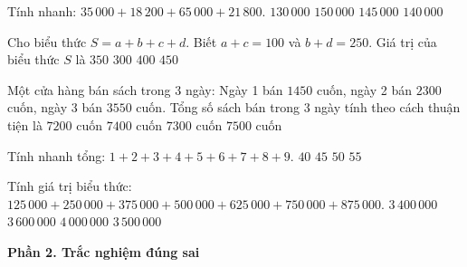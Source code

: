 \begin{ex} %
Tính nhanh: $35\,000 + 18\,200 + 65\,000 + 21\,800$.
\choice
{$130\,000$}
{$150\,000$}
{$145\,000$}
{\True $140\,000$}
\end{ex}

\begin{ex} %
Cho biểu thức $S = a + b + c + d$. Biết $a + c = 100$ và $b + d = 250$. Giá trị của biểu thức $S$ là
\choice
{\True $350$}
{$300$}
{$400$}
{$450$}
\end{ex}

\begin{ex} %
Một cửa hàng bán sách trong 3 ngày: Ngày 1 bán $1450$ cuốn, ngày 2 bán $2300$ cuốn, ngày 3 bán $3550$ cuốn. Tổng số sách bán trong 3 ngày tính theo cách thuận tiện là
\choice
{$7200$ cuốn}
{$7400$ cuốn}
{\True $7300$ cuốn}
{$7500$ cuốn}
\end{ex}

\begin{ex} %
Tính nhanh tổng: $1 + 2 + 3 + 4 + 5 + 6 + 7 + 8 + 9$.
\choice
{$40$}
{\True $45$}
{$50$}
{$55$}
\end{ex}

\begin{ex} %
Tính giá trị biểu thức: $125\,000 + 250\,000 + 375\,000 + 500\,000 + 625\,000 + 750\,000 + 875\,000$.
\choice
{$3\,400\,000$}
{$3\,600\,000$}
{$4\,000\,000$}
{\True $3\,500\,000$}
\end{ex}

\textbf{Phần 2. Trắc nghiệm đúng sai}

